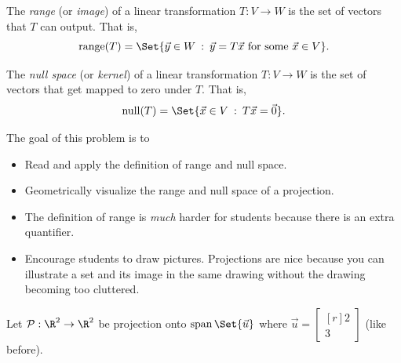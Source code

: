 \documentclass{problemset}
\DeclareMathOperator{\Span}{span}
\DeclareMathOperator{\Range}{range}
\DeclareMathOperator{\Null}{null}
\newcommand{\mat}[1]{\begin{bmatrix*}[r]#1\end{bmatrix*}}
\providecommand\given{}
\newcommand\SetSymbol[1][]{%
	\nonscript\::%
	\allowbreak
	\nonscript\:
	\mathopen{}}
\renewcommand\given{\SetSymbol[\delimsize]}
\begin{document}
	\begin{definition}[Range]
		The \emph{range} (or \emph{image}) of a linear transformation $T:V\to W$
		is the set of vectors that $T$ can output. That is,
		\[
			\Range(T)=\Set{\vec y\in W \given \vec y=T\vec x\text{ for some }\vec x\in V}.
		\]
	\end{definition}
	\begin{definition}
		The \emph{null space} (or \emph{kernel}) of a linear transformation $T:V\to W$
		is the set of vectors that get mapped to zero under $T$. That is,
		\[
			\Null(T)=\Set{\vec x\in V \given T\vec x=\vec 0}.
		\]
	\end{definition}

	\question
	\begin{annotation}
		\begin{goals}

			The goal of this problem is to
			\begin{itemize}
				\item Read and apply the definition of range and null space.
				\item Geometrically visualize the range and null space of a projection.
			\end{itemize}
		\end{goals}

		\begin{notes}
			\begin{itemize}
				\item The definition of range is \emph{much} harder for students
					because there is an extra quantifier.
				\item Encourage students to draw pictures. Projections are nice because you can illustrate
					a set and its image in the same drawing without the drawing becoming too cluttered.
			\end{itemize}
		\end{notes}
	\end{annotation}
	Let $\mathcal P:\R^2\to\R^2$ be projection onto $\Span\Set{\vec u}$ where
	$\vec u=\mat{2\\3}$ (like before).
\end{document}
